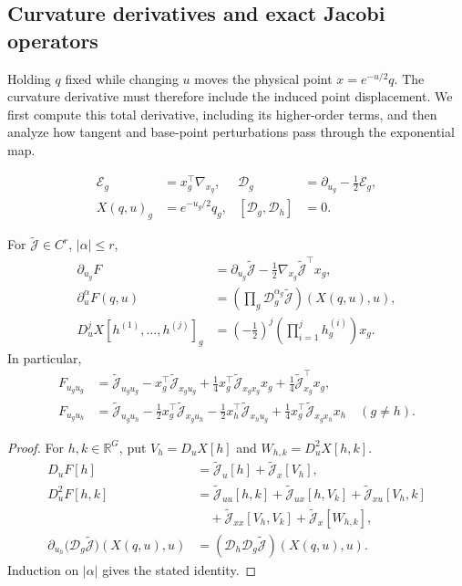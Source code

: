 \subsection{Curvature derivatives and exact Jacobi operators}
\label{app:rigid-differential}
Holding $q$ fixed while changing $u$ moves the physical point $x=e^{-u/2}q$. The curvature derivative must therefore include the induced point displacement. We first compute this total derivative, including its higher-order terms, and then analyze how tangent and base-point perturbations pass through the exponential map.
\begin{definition}
\begin{align}
 \mathcal E_g&=x_g^\top\nabla_{x_g},&
 \mathcal D_g&=\partial_{u_g}-\tfrac12\mathcal E_g,\\
 X(q,u)_g&=e^{-u_g/2}q_g,&
 [\mathcal D_g,\mathcal D_h]&=0.
\end{align}
\end{definition}
\begin{proposition}
For $\widetilde{\mathcal J}\in C^r$, $|\alpha|\le r$,
\begin{align}\label{eq:total-curv-gradient}
 \partial_{u_g}F
 &=\partial_{u_g}\widetilde{\mathcal J}
   -\tfrac12\nabla_{x_g}\widetilde{\mathcal J}^{\top}x_g,\\
 \partial_u^\alpha F(q,u)
 &=\left(\prod_g\mathcal D_g^{\alpha_g}\widetilde{\mathcal J}\right)(X(q,u),u),\\
 D_u^jX[h^{(1)},\ldots,h^{(j)}]_g
 &=(-\tfrac12)^j\left(\prod_{i=1}^jh_g^{(i)}\right)x_g.
\end{align}
In particular,
\begin{align}
 F_{u_gu_g}
 &=\widetilde{\mathcal J}_{u_gu_g}
 -x_g^\top\widetilde{\mathcal J}_{x_gu_g}
 +\tfrac14x_g^\top\widetilde{\mathcal J}_{x_gx_g}x_g
 +\tfrac14\widetilde{\mathcal J}_{x_g}^\top x_g,\\
 F_{u_gu_h}
 &=\widetilde{\mathcal J}_{u_gu_h}
 -\tfrac12x_g^\top\widetilde{\mathcal J}_{x_gu_h}
 -\tfrac12x_h^\top\widetilde{\mathcal J}_{x_hu_g}
 +\tfrac14x_g^\top\widetilde{\mathcal J}_{x_gx_h}x_h
 \quad(g\ne h).
\end{align}
\end{proposition}
\begin{proof}
For $h,k\in\mathbb R^G$, put $V_h=D_uX[h]$ and $W_{h,k}=D_u^2X[h,k]$.
\begin{align}
 D_uF[h]&=\widetilde{\mathcal J}_u[h]+\widetilde{\mathcal J}_x[V_h],\\
 D_u^2F[h,k]
 &=\widetilde{\mathcal J}_{uu}[h,k]
 +\widetilde{\mathcal J}_{ux}[h,V_k]
 +\widetilde{\mathcal J}_{xu}[V_h,k]\\
 &\quad+\widetilde{\mathcal J}_{xx}[V_h,V_k]
 +\widetilde{\mathcal J}_x[W_{h,k}],\\
 \partial_{u_h}\bigl(\mathcal D_g\widetilde{\mathcal J}\bigr)(X(q,u),u)
 &=(\mathcal D_h\mathcal D_g\widetilde{\mathcal J})(X(q,u),u).
\end{align}
Induction on $|\alpha|$ gives the stated identity.
\end{proof}

